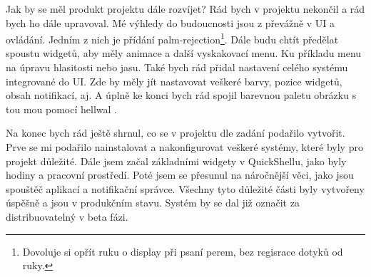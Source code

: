 \documentclass[12pt,a4paper]{article}
\begin{document}
Jak by se měl produkt projektu dále rozvíjet? Rád bych v projektu nekončil a rád bych ho dále upravoval. Mé výhledy do budoucnosti jsou z
převážně v UI a ovládání. Jedním z nich je přídání palm-rejection\footnote{Dovoluje si opřít ruku o display při psaní perem, bez regisrace
dotyků od ruky.}. Dále budu chtít předělat spoustu widgetů, aby měly animace a další vyskakovací menu. Ku příkladu menu na úpravu hlasitosti
nebo jasu. Také bych rád přidal nastavení celého systému integrované do UI. Zde by měly jít nastavovat veškeré barvy, pozice widgetů, obsah
notifikací, aj. A úplně ke konci bych rád spojil barevnou paletu obrázku s tou mou pomocí hellwal \autocite{DanihekHellwalPywallike}.

Na konec bych rád ještě shrnul, co se v projektu dle zadání podařilo vytvořit. Prve se mi podařilo nainstalovat a nakonfigurovat veškeré
systémy, které byly pro projekt důležité. Dále jsem začal základními widgety v QuickShellu, jako byly hodiny a pracovní prostředí. Poté jsem 
se přesunul na náročnější věci, jako jsou spouštěč aplikací a notifikační správce. Všechny tyto důležité části byly vytvořeny úspěšně a 
jsou v produkčním stavu. Systém by se dal již označit za distribuovatelný v beta fázi.

\newpage
\printbibliography[
heading=bibintoc,
title={Zdroje}
]
\end{document}
